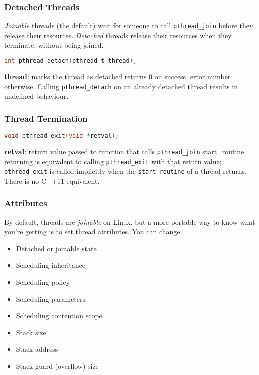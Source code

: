 \begin{frame}[fragile]
  \frametitle{Detached Threads}


  {\it Joinable} threads (the default) wait for someone to call
  {\tt pthread\_join} before they release their resources.
  \vfill
  {\it Detached} threads release their resources when they terminate, without
  being joined.
  \vfill
  \begin{lstlisting}[language=C]
int pthread_detach(pthread_t thread);
  \end{lstlisting}
  \vfill
  {\bf thread}: marks the thread as detached
  \vfill
  returns 0 on success, error number otherwise.
  \vfill
  Calling {\tt pthread\_detach} on an already detached thread results in undefined
  behaviour.


\end{frame}

\begin{frame}[fragile]
  \frametitle{Thread Termination}


  \begin{lstlisting}[language=C]
void pthread_exit(void *retval);
  \end{lstlisting}
  \vfill
  {\bf retval}: return value passed to function that calls {\tt pthread\_join}
  \vfill
  start\_routine returning is equivalent to calling {\tt pthread\_exit} with
  that return value;
  \vfill
  {\tt pthread\_exit} is called implicitly when the {\tt start\_routine} of a
  thread returns.
  \vfill
  There is no C++11 equivalent.


\end{frame}

\begin{frame}
  \frametitle{Attributes}


  By default, threads are {\it joinable} on Linux, but a more portable way to
  know what you're getting is to set thread attributes. You can change:
  \begin{itemize}
    \item Detached or joinable state
    \item Scheduling inheritance
    \item Scheduling policy
    \item Scheduling parameters
    \item Scheduling contention scope
    \item Stack size
    \item Stack address
    \item Stack guard (overflow) size
  \end{itemize}


\end{frame}

